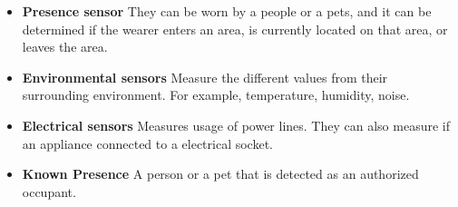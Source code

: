 \begin{itemize}
\item \textbf{Presence sensor} They can be worn by a people or a pets, and it can be determined if the wearer enters an area, is currently located on that area, or leaves the area. 

\item \textbf{Environmental sensors} Measure the different values from their surrounding environment. For example, temperature, humidity, noise. 

\item \textbf{Electrical sensors} Measures usage of power lines. They can also measure if an appliance connected to a electrical socket. 

\item \textbf{Known Presence}  A person or a pet that is detected as an authorized occupant.

\end{itemize}
